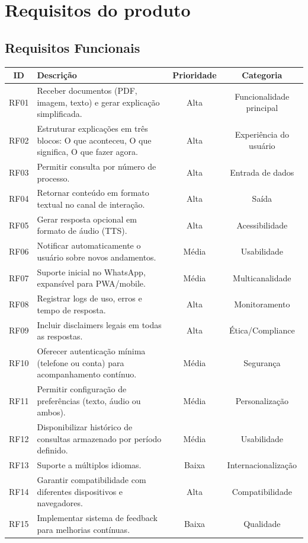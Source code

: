 \documentclass{article}
\begin{document}
\section{Requisitos do produto}
\subsection*{Requisitos Funcionais}
\begin{tabular}{|c|p{7cm}|c|c|}
\hline
\textbf{ID} & \textbf{Descrição} & \textbf{Prioridade} & \textbf{Categoria} \\
\hline
RF01 & Receber documentos (PDF, imagem, texto) e gerar explicação simplificada. & Alta & Funcionalidade principal \\\hline
RF02 & Estruturar explicações em três blocos: O que aconteceu, O que significa, O que fazer agora. & Alta & Experiência do usuário \\\hline
RF03 & Permitir consulta por número de processo. & Alta & Entrada de dados \\\hline
RF04 & Retornar conteúdo em formato textual no canal de interação. & Alta & Saída \\\hline
RF05 & Gerar resposta opcional em formato de áudio (TTS). & Alta & Acessibilidade \\\hline
RF06 & Notificar automaticamente o usuário sobre novos andamentos. & Média & Usabilidade \\\hline
RF07 & Suporte inicial no WhatsApp, expansível para PWA/mobile. & Média & Multicanalidade \\\hline
RF08 & Registrar logs de uso, erros e tempo de resposta. & Alta & Monitoramento \\\hline
RF09 & Incluir disclaimers legais em todas as respostas. & Alta & Ética/Compliance \\\hline
RF10 & Oferecer autenticação mínima (telefone ou conta) para acompanhamento contínuo. & Média & Segurança \\\hline
RF11 & Permitir configuração de preferências (texto, áudio ou ambos). & Média & Personalização \\\hline
RF12 & Disponibilizar histórico de consultas armazenado por período definido. & Média & Usabilidade \\\hline
RF13 & Suporte a múltiplos idiomas. & Baixa & Internacionalização \\\hline
RF14 & Garantir compatibilidade com diferentes dispositivos e navegadores. & Alta & Compatibilidade \\\hline
RF15 & Implementar sistema de feedback para melhorias contínuas. & Baixa & Qualidade \\
\hline
\end{tabular}
\end{document}
